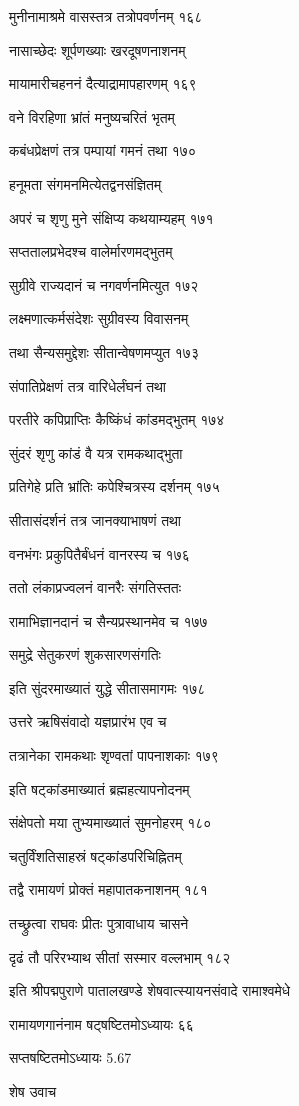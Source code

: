 मुनीनामाश्रमे वासस्तत्र तत्रोपवर्णनम् १६८

नासाच्छेदः शूर्पणख्याः खरदूषणनाशनम्

मायामारीचहननं दैत्याद्रामापहारणम् १६९

वने विरहिणा भ्रांतं मनुष्यचरितं भृतम्

कबंधप्रेक्षणं तत्र पम्पायां गमनं तथा १७०

हनूमता संगमनमित्येतद्वनसंज्ञितम्

अपरं च शृणु मुने संक्षिप्य कथयाम्यहम् १७१

सप्ततालप्रभेदश्च वालेर्मारणमद्भुतम्

सुग्रीवे राज्यदानं च नगवर्णनमित्युत १७२

लक्ष्मणात्कर्मसंदेशः सुग्रीवस्य विवासनम्

तथा सैन्यसमुद्देशः सीतान्वेषणमप्युत १७३

संपातिप्रेक्षणं तत्र वारिधेर्लंघनं तथा

परतीरे कपिप्राप्तिः कैष्किंधं कांडमद्भुतम् १७४

सुंदरं शृणु कांडं वै यत्र रामकथाद्भुता

प्रतिगेहे प्रति भ्रांतिः कपेश्चित्रस्य दर्शनम् १७५

सीतासंदर्शनं तत्र जानक्याभाषणं तथा

वनभंगः प्रकुपितैर्बंधनं वानरस्य च १७६

ततो लंकाप्रज्वलनं वानरैः संगतिस्ततः

रामाभिज्ञानदानं च सैन्यप्रस्थानमेव च १७७

समुद्रे सेतुकरणं शुकसारणसंगतिः

इति सुंदरमाख्यातं युद्धे सीतासमागमः १७८

उत्तरे ऋषिसंवादो यज्ञप्रारंभ एव च

तत्रानेका रामकथाः शृण्वतां पापनाशकाः १७९

इति षट्कांडमाख्यातं ब्रह्महत्यापनोदनम्

संक्षेपतो मया तुभ्यमाख्यातं सुमनोहरम् १८०

चतुर्विंशतिसाहस्रं षट्कांडपरिचिह्नितम्

तद्वै रामायणं प्रोक्तं महापातकनाशनम् १८१

तच्छ्रुत्वा राघवः प्रीतः पुत्रावाधाय चासने

दृढं तौ परिरभ्याथ सीतां सस्मार वल्लभाम् १८२

इति श्रीपद्मपुराणे पातालखण्डे शेषवात्स्यायनसंवादे रामाश्वमेधे

रामायणगानंनाम षट्षष्टितमोऽध्यायः ६६

सप्तषष्टितमोऽध्यायः 5.67

शेष उवाच

